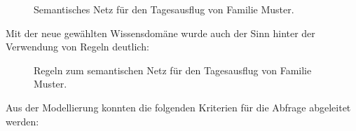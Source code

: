 \begin{figure}[H]
\centering {}
\caption{Semantisches Netz für den Tagesausflug von Familie Muster.\label{fig:famMuster}\protect\footnotemark}
\end{figure}

Mit der neue gewählten Wissensdomäne wurde auch der Sinn hinter der Verwendung von Regeln deutlich:
\begin{figure}[H]
    \centering {}
    \caption{Regeln zum semantischen Netz für den Tagesausflug von Familie Muster.\label{fig:famMusterRegeln}\protect\footnotemark}
\end{figure}

Aus der Modellierung konnten die folgenden Kriterien für die Abfrage abgeleitet werden:

